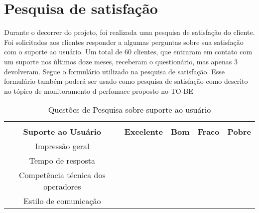 \section{Pesquisa de satisfação}

Durante o decorrer do projeto, foi
realizada uma pesquisa de satisfação do
cliente. Foi solicitados aos clientes
responder a algumas perguntas sobre sua
satisfação com o suporte ao usuário. Um total de
60 clientes, que entraram em contato com um suporte
nos últimos doze meses, receberam o questionário, mas
apenas 3 devolveram. Segue o formulário utilizado na
pesquisa de satisfação. Esse formulário também
poderá ser usado como pesquisa de satisfação como descrito no
tópico de monitoramento d perfomace proposto no TO-BE


\begin{table}[htb]
\centering
\caption{Questões de Pesquisa sobre suporte ao usuário}
\label{my-label}
\begin{tabular}{cl|c|c|c|c|}
\cline{3-6}
\multicolumn{1}{l}{}                              &                              & \cellcolor[HTML]{9AFF99}                                     & \cellcolor[HTML]{9AFF99}                               & \cellcolor[HTML]{9AFF99}                                 & \cellcolor[HTML]{9AFF99}                                 \\ \cline{1-2}
\multicolumn{2}{|c|}{\cellcolor[HTML]{FFFC9E}\textbf{Suporte ao Usuário}}        & \multirow{-2}{*}{\cellcolor[HTML]{9AFF99}\textbf{Excelente}} & \multirow{-2}{*}{\cellcolor[HTML]{9AFF99}\textbf{Bom}} & \multirow{-2}{*}{\cellcolor[HTML]{9AFF99}\textbf{Fraco}} & \multirow{-2}{*}{\cellcolor[HTML]{9AFF99}\textbf{Pobre}} \\ \hline
\multicolumn{2}{|c|}{\cellcolor[HTML]{FFFFC7}Impressão geral}                    &                                                              &                                                        &                                                          &                                                          \\ \hline
\multicolumn{2}{|c|}{\cellcolor[HTML]{FFFFC7}Tempo de resposta}                  &                                                              &                                                        &                                                          &                                                          \\ \hline
\multicolumn{2}{|c|}{\cellcolor[HTML]{FFFFC7}Competência técnica dos operadores} &                                                              &                                                        &                                                          &                                                          \\ \hline
\multicolumn{2}{|c|}{\cellcolor[HTML]{FFFFC7}Estilo de comunicação}              &                                                              &                                                        &                                                          &                                                          \\ \hline
\end{tabular}
\end{table}


